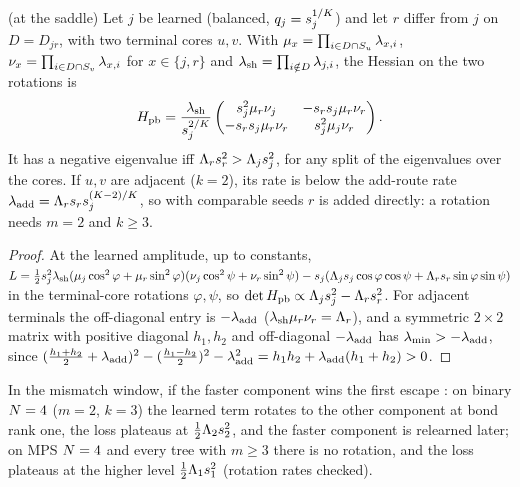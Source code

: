 \begin{proposition}\label{prop:A-piggyback-cov}
  \proven{} (at the saddle) \newresult[for TTNs; on binary $\Ns=4$, a deep linear network, it follows from
  \citealp{achour2024loss}, Thm~7, with \cref{prop:A-precond}]
  Let $j$ be learned (balanced, $q_j=s_{j}^{1/K}$) and let $r$ differ from $j$ on $D=D_{jr}$, with two terminal
  cores $u,v$. With $\mu_x=\prod_{i\in D\cap S_{u}}\lambda_{x,i}$, $\nu_x=\prod_{i\in D\cap S_{v}}\lambda_{x,i}$ for
  $x\in\{j,r\}$ and $\lambda_{\rm sh}=\prod_{i\notin D}\lambda_{j,i}$, the Hessian on the two rotations is
  \begin{equation}\label{eq:A-piggyback-cov}
    H_{\rm pb}=\frac{\lambda_{\rm sh}}{s_{j}^{2/K}}\begin{pmatrix}s_{j}^2\mu_r\nu_j&-s_{r}s_{j}\mu_r\nu_r\\
    -s_{r}s_{j}\mu_r\nu_r&s_{j}^2\mu_j\nu_r\end{pmatrix}.
  \end{equation}
  It has a negative eigenvalue iff $\Lambda_rs_{r}^2>\Lambda_js_{j}^2$, for any split of the eigenvalues over the cores.
  If $u,v$ are adjacent ($k=2$), its rate is below the add-route rate $\lambda_{\rm add}=\Lambda_rs_{r}s_{j}^{(K-2)/K}$, so with
  comparable seeds $r$ is added directly: a rotation needs $m=2$ and $k\ge3$.
\end{proposition}
\begin{proof}
  At the learned amplitude, up to constants,
  $L=\frac12s_{j}^2\lambda_{\rm sh}(\mu_j\cos^2\varphi+\mu_r\sin^2\varphi)(\nu_j\cos^2\psi+\nu_r\sin^2\psi)
  -s_{j}(\Lambda_js_{j}\cos\varphi\cos\psi+\Lambda_rs_{r}\sin\varphi\sin\psi)$ in the terminal-core rotations $\varphi,\psi$, so
  $\det H_{\rm pb}\propto\Lambda_js_{j}^2-\Lambda_rs_{r}^2$. For adjacent terminals the off-diagonal entry is $-\lambda_{\rm add}$
  ($\lambda_{\rm sh}\mu_r\nu_r=\Lambda_r$), and a symmetric $2\times2$ matrix with positive diagonal $h_1,h_2$ and off-diagonal
  $-\lambda_{\rm add}$ has $\lambda_{\min}>-\lambda_{\rm add}$, since
  $(\frac{h_1+h_2}2+\lambda_{\rm add})^2-(\frac{h_1-h_2}2)^2-\lambda_{\rm add}^2=h_1h_2+\lambda_{\rm add}(h_1+h_2)>0$.
\end{proof}
In the mismatch window, if the faster component wins the first escape \derived: on binary $\Ns=4$ ($m=2$,
$k=3$) the learned term rotates to the other component at bond rank one, the loss plateaus at
$\frac12\Lambda_2s_{2}^2$, and the faster component is relearned later; on MPS $\Ns=4$ and every tree with $m\ge3$
there is no rotation, and the loss plateaus at the higher level $\frac12\Lambda_1s_{1}^2$ (rotation rates checked).

